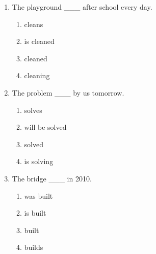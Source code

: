 \documentclass[11pt,a4paper]{ctexart}
\begin{document}
\begin{enumerate}[leftmargin=*,itemsep=4pt]
\begin{enumerate}[label=\Alph*.,leftmargin=2em,itemsep=1pt,topsep=2pt]
\item return
\end{enumerate}
\item The playground \_\_\_ after school every day.
\begin{enumerate}[label=\Alph*.,leftmargin=2em,itemsep=1pt,topsep=2pt]
\item cleans
\item is cleaned
\item cleaned
\item cleaning
\end{enumerate}
\item The problem \_\_\_ by us tomorrow.
\begin{enumerate}[label=\Alph*.,leftmargin=2em,itemsep=1pt,topsep=2pt]
\item solves
\item will be solved
\item solved
\item is solving
\end{enumerate}
\item The bridge \_\_\_ in 2010.
\begin{enumerate}[label=\Alph*.,leftmargin=2em,itemsep=1pt,topsep=2pt]
\item was built
\item is built
\item built
\item builds
\end{enumerate}
\end{enumerate}
\end{document}
